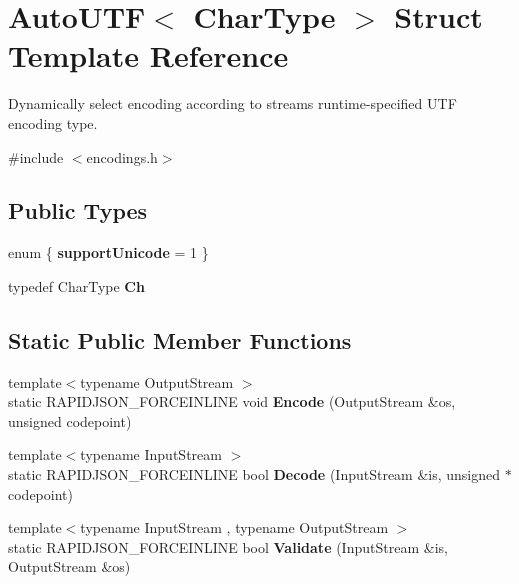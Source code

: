 \hypertarget{struct_auto_u_t_f}{}\section{Auto\+U\+TF$<$ Char\+Type $>$ Struct Template Reference}
\label{struct_auto_u_t_f}


Dynamically select encoding according to stream\textquotesingle{}s runtime-\/specified U\+TF encoding type.  




{\ttfamily \#include $<$encodings.\+h$>$}

\subsection*{Public Types}
\begin{DoxyCompactItemize}
\item 
enum \{ {\bfseries support\+Unicode} = 1
 \}\hypertarget{struct_auto_u_t_f_a2dff52b1439e7ccef2040cdc8e7ff5bb}{}\label{struct_auto_u_t_f_a2dff52b1439e7ccef2040cdc8e7ff5bb}

\item 
typedef Char\+Type {\bfseries Ch}\hypertarget{struct_auto_u_t_f_a0609343de776df3bc31b4c980eb3cf1c}{}\label{struct_auto_u_t_f_a0609343de776df3bc31b4c980eb3cf1c}

\end{DoxyCompactItemize}
\subsection*{Static Public Member Functions}
\begin{DoxyCompactItemize}
\item 
{\footnotesize template$<$typename Output\+Stream $>$ }\\static R\+A\+P\+I\+D\+J\+S\+O\+N\+\_\+\+F\+O\+R\+C\+E\+I\+N\+L\+I\+NE void {\bfseries Encode} (Output\+Stream \&os, unsigned codepoint)\hypertarget{struct_auto_u_t_f_a414946115261f886e74dd42cb4b98781}{}\label{struct_auto_u_t_f_a414946115261f886e74dd42cb4b98781}

\item 
{\footnotesize template$<$typename Input\+Stream $>$ }\\static R\+A\+P\+I\+D\+J\+S\+O\+N\+\_\+\+F\+O\+R\+C\+E\+I\+N\+L\+I\+NE bool {\bfseries Decode} (Input\+Stream \&is, unsigned $\ast$codepoint)\hypertarget{struct_auto_u_t_f_aa5e3c1dc23dbb75f6442ff69500a35b0}{}\label{struct_auto_u_t_f_aa5e3c1dc23dbb75f6442ff69500a35b0}

\item 
{\footnotesize template$<$typename Input\+Stream , typename Output\+Stream $>$ }\\static R\+A\+P\+I\+D\+J\+S\+O\+N\+\_\+\+F\+O\+R\+C\+E\+I\+N\+L\+I\+NE bool {\bfseries Validate} (Input\+Stream \&is, Output\+Stream \&os)\hypertarget{struct_auto_u_t_f_a36dd6f226d6a07c12161e21c0aff20b1}{}\label{struct_auto_u_t_f_a36dd6f226d6a07c12161e21c0aff20b1}

\end{DoxyCompactItemize}


